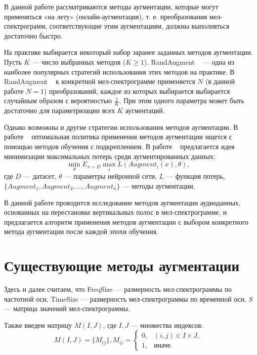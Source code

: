 \documentclass[12pt, fleqn]{article}
\begin{document}
В данной работе рассматриваются методы аугментации, которые могут применяться «на лету» (онлайн-аугментация), т. е. преобразования мел-спектрограмм, соответствующие этим аугментациям, должны выполняться достаточно быстро.

На практике выбирается некоторый набор заранее заданных методов аугментации. Пусть $K$ --- число выбранных методов ($K \geq 1$). RandAugment ~\cite{RandAugment} --- одна из наиболее популярных стратегий использования этих методов на практике. В RandAugment ~\cite{RandAugment} к конкретной мел-спектрограмме применяется $N$ (в данной работе $N = 1$) преобразований, каждое из которых выбирается выбирается случайным образом с вероятностью $\frac{1}{K}$. При этом одного параметра может быть достаточно для параметризации всех $K$ аугментаций.

Однако возможны и другие стратегии использования методов аугментации. В работе ~\cite{AutoAugment} оптимальная политика применения методов аугментации ищется с помощью методов обучения с подкреплением. В работе ~\cite{MaxUp} предлагается идея минимизации максимальных потерь среди аугментированных данных: \newline
$$\min_{\theta} E_{x \sim D} \max_i L(Augment_i(x), \theta),$$ где $D$ --- датасет,
$\theta$ --- параметры нейронной сети, $L$ --- функция потерь, $\{Augment_1, Augment_2, ..., Augment_n\}$ --- методы аугментации.

В данной работе проводится исследование методов аугментации аудиоданных, основанных на перестановке вертикальных полос в мел-спектрограмме, и предлагается алгоритм применения методов аугментации с выбором конкретного метода аугментации после каждой эпохи обучения.

\section{Существующие методы аугментации}
Здесь и далее считаем, что FreqSize --- размерность мел-спектрограммы по частотной оси, TimeSize --- размерность мел-спектрограммы по временной оси, $S$ --- матрица значений мел-спектрограммы. 

Также введем матрицу $M(I, J)$, где $I, J$ --- множества индексов: \newline 
\begin{equation*}
M(I, J) = \{M_{ij}\},  M_{ij} = 
\begin{cases}
0, & (i,j) \in I \times J,\\
1, &\text{иначе}.
\end{cases}
\end{equation*}
\end{document}
